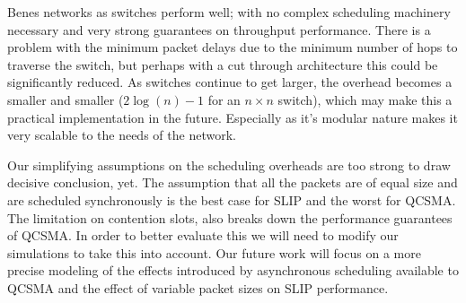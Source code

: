 \documentclass{IEEEtran}%
\begin{document}
Benes networks as switches perform well; with no complex scheduling machinery necessary and very strong guarantees on throughput performance.  There is a problem with the minimum packet delays due to the minimum number of hops to traverse the switch, but perhaps with a cut through architecture this could be significantly reduced.  As switches continue to get larger, the overhead becomes a smaller and smaller ($2\log(n)-1$ for an $n\times n$ switch), which may make this a practical implementation in the future.  Especially as it's modular nature makes it very scalable to the needs of the network.

Our simplifying assumptions on the scheduling overheads are too strong to draw decisive conclusion, yet.  The assumption that all the packets are of equal size and are scheduled synchronously is the best case for SLIP and the worst for QCSMA.  The limitation on contention slots, also breaks down the performance guarantees of QCSMA.  In order to better evaluate this we will need to modify our simulations to take this into account. Our future work will focus on a more precise modeling of the effects introduced by asynchronous scheduling available to QCSMA and the effect of variable packet sizes on SLIP performance.




\end{document}
